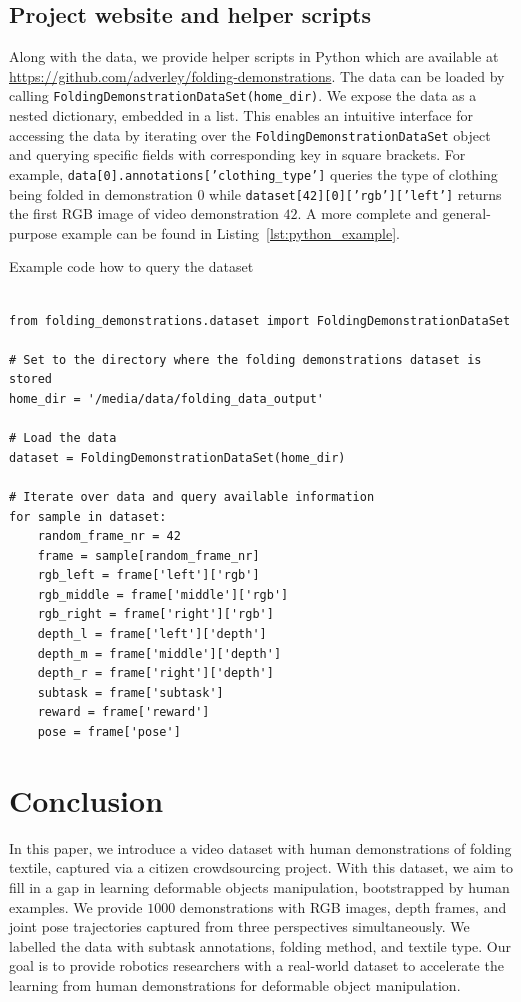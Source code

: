 \documentclass[\home/main.tex]{subfiles}
\begin{document}
\subsection{Project website and helper scripts}
Along with the data, we provide helper scripts in Python which are available at \url{https://github.com/adverley/folding-demonstrations}. The data can be loaded by calling \texttt{FoldingDemonstrationDataSet(home_dir)}. We expose the data as a nested dictionary, embedded in a list. This enables an intuitive interface for accessing the data by iterating over the \texttt{FoldingDemonstrationDataSet} object and querying specific fields with corresponding key in square brackets. For example, \texttt{data[0].annotations['clothing_type']} queries the type of clothing being folded in demonstration $0$ while \texttt{dataset[42][0]['rgb']['left']} returns the first RGB image of video demonstration $42$. A more complete and general-purpose example can be found in Listing~\ref{lst:python_example}.

\begin{listing}[htb]
\caption{Example code how to query the dataset}
\label{lst:python_example}
\begin{verbatim}
 
from folding_demonstrations.dataset import FoldingDemonstrationDataSet

# Set to the directory where the folding demonstrations dataset is stored
home_dir = '/media/data/folding_data_output'

# Load the data
dataset = FoldingDemonstrationDataSet(home_dir)

# Iterate over data and query available information
for sample in dataset:
    random_frame_nr = 42
    frame = sample[random_frame_nr]
    rgb_left = frame['left']['rgb']
    rgb_middle = frame['middle']['rgb']
    rgb_right = frame['right']['rgb']
    depth_l = frame['left']['depth']
    depth_m = frame['middle']['depth']
    depth_r = frame['right']['depth']
    subtask = frame['subtask']
    reward = frame['reward']
    pose = frame['pose']

\end{verbatim}
\end{listing}


\section{Conclusion}

In this paper, we introduce a video dataset with human demonstrations of folding textile, captured via a citizen crowdsourcing project. With this dataset, we aim to fill in a gap in learning deformable objects manipulation, bootstrapped by human examples. We provide $1000$ demonstrations with RGB images, depth frames, and joint pose trajectories captured from three perspectives simultaneously. We labelled the data with subtask annotations, folding method, and textile type. Our goal is to provide robotics researchers with a real-world dataset to accelerate the learning from human demonstrations for deformable object manipulation.
\end{document}

